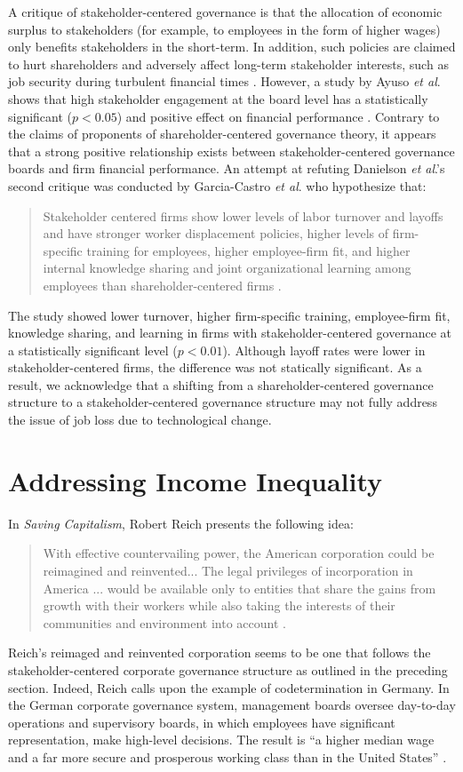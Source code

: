 \documentclass[12pt]{article}
\begin{document}
A critique of stakeholder-centered governance is that the allocation of economic surplus to stakeholders (for example, to employees in the form of higher wages) only benefits stakeholders in the short-term. In addition, such policies are claimed to hurt shareholders and adversely affect long-term stakeholder interests, such as job security during turbulent financial times \cite[Danielson \textit{et al}. 4]{Danielson}. However, a study by Ayuso \textit{et al}. shows that high stakeholder engagement at the board level has a statistically significant ($p < 0.05$) and positive effect on financial performance \cite[Ayuso \textit{et al}. 425]{Ayuso}. Contrary to the claims of proponents of shareholder-centered governance theory, it appears that a strong positive relationship exists between stakeholder-centered governance boards and firm financial performance. An attempt at refuting Danielson \textit{et al}.'s second critique was conducted by Garcia-Castro \textit{et al}. who hypothesize that:
\blockquote{Stakeholder centered firms show lower levels of labor turnover and layoffs and have stronger worker displacement policies, higher levels of firm-specific training for employees, higher employee-firm fit, and higher internal knowledge sharing and joint organizational learning among employees than shareholder-centered firms \cite[Garcia-Castro \textit{et al}. 265]{GarciaCastro}.}
The study showed lower turnover, higher firm-specific training, employee-firm fit, knowledge sharing, and learning in firms with stakeholder-centered governance at a statistically significant level ($p < 0.01$). Although layoff rates were lower in stakeholder-centered firms, the difference was not statically significant.  As a result, we acknowledge that a shifting from a shareholder-centered governance structure to a stakeholder-centered governance structure may not fully address the issue of job loss due to technological change. 
\section{\large Addressing Income Inequality}
In \textit{Saving Capitalism}, Robert Reich presents the following idea:
\blockquote{With effective countervailing power, the American corporation could be reimagined and reinvented... The legal privileges of incorporation in America ... would be available only to entities that share the gains from growth with their workers while also taking the interests of their communities and environment into account \cite[Reich 202]{Reich}.}
Reich's reimaged and reinvented corporation seems to be one that follows the stakeholder-centered corporate governance structure as outlined in the preceding section. Indeed, Reich calls upon the example of codetermination in Germany. In the German corporate governance system, management boards oversee day-to-day operations and supervisory boards, in which employees have significant representation, make high-level decisions. The result is ``a higher median wage and a far more secure and prosperous working class than in the United States'' \cite[Reich 202]{Reich}. 
\end{document}
